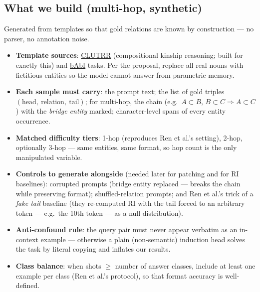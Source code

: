 \documentclass[11pt]{article}
\begin{document}
\subsection{What we build (multi-hop, synthetic)}
Generated from templates so that gold relations are known by construction --- no parser, no annotation noise.
\begin{itemize}[itemsep=2pt]
  \item \textbf{Template sources}: \href{https://github.com/facebookresearch/clutrr}{CLUTRR} (compositional kinship reasoning; built for exactly this) and \href{https://research.facebook.com/downloads/babi/}{bAbI} tasks. Per the proposal, replace all real nouns with fictitious entities so the model cannot answer from parametric memory.
  \item \textbf{Each sample must carry}: the prompt text; the list of gold triples $(\text{head},\ \text{relation},\ \text{tail})$; for multi-hop, the chain (e.g.\ $A\!\subset\!B$, $B\!\subset\!C \Rightarrow A\!\subset\!C$) with the \emph{bridge entity} marked; character-level spans of every entity occurrence.
  \item \textbf{Matched difficulty tiers}: 1-hop (reproduces Ren et al.'s setting), 2-hop, optionally 3-hop --- same entities, same format, so hop count is the only manipulated variable.
  \item \textbf{Controls to generate alongside} (needed later for patching and for RI baselines):
    corrupted prompts (bridge entity replaced --- breaks the chain while preserving format);
    shuffled-relation prompts; and Ren et al.'s trick of a \emph{fake tail} baseline (they re-computed RI with the tail forced to an arbitrary token --- e.g.\ the 10th token --- as a null distribution).
  \item \textbf{Anti-confound rule}: the query pair must never appear verbatim as an in-context example --- otherwise a plain (non-semantic) induction head solves the task by literal copying and inflates our results.
  \item \textbf{Class balance}: when shots $\geq$ number of answer classes, include at least one example per class (Ren et al.'s protocol), so that format accuracy is well-defined.
\end{itemize}
\end{document}
